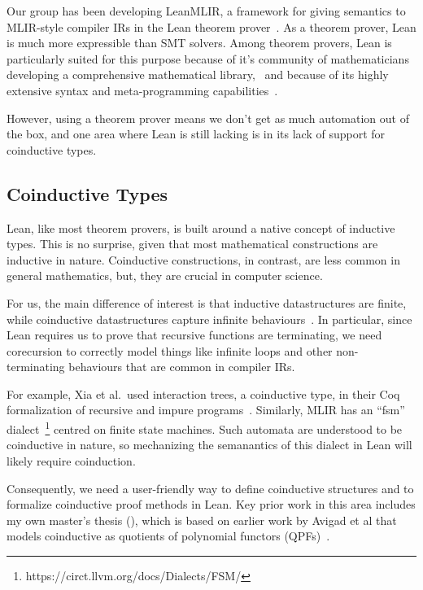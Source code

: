 \documentclass[a4paper]{scrartcl}
\begin{document}
Our group has been developing
LeanMLIR, a framework for giving
semantics to MLIR-style compiler IRs in the Lean theorem prover~\cite{demouraLeanTheoremProver2015}. 
As a theorem prover, Lean is
much more expressible than SMT solvers. Among theorem provers, Lean is
particularly suited for this purpose because of it's community of
mathematicians developing a comprehensive mathematical library,~\cite{themathlibcommunityLeanMathematicalLibrary2020} 
and because of its highly extensive syntax and meta-programming capabilities~\cite{ullrichNotationsHygienicMacro2022, paulinoMetaprogrammingLean}.

However, using a theorem prover means we don't get as much automation
out of the box, and one area where Lean is still lacking is in its lack
of support for coinductive types.


\subsection{Coinductive Types}\label{coinductive-types}

Lean, like most theorem provers, is built around a native concept
of inductive types. This is no surprise, given that most mathematical
constructions are inductive in nature. Coinductive constructions, in
contrast, are less common in general mathematics, but, they are crucial
in computer science.

For us, the main difference of interest is that inductive datastructures
are finite, while coinductive datastructures capture infinite
behaviours~\cite{sangiorgiIntroductionBisimulationCoinduction2011}.
In particular, since Lean requires us to prove that recursive functions are
terminating, we need corecursion to correctly model things like infinite
loops and other non-terminating behaviours that are common in compiler
IRs.

For example, Xia et al.~used interaction trees, a coinductive type, in
their Coq formalization of recursive and impure programs~\cite{xiaInteractionTreesRepresenting2020}.
Similarly, MLIR has an
``fsm'' dialect~\footnote{https://circt.llvm.org/docs/Dialects/FSM/}
centred on finite state machines. Such automata are understood to be
coinductive in nature, so mechanizing the semanantics of this dialect in
Lean will likely require coinduction.

Consequently, we need a user-friendly way to define coinductive
structures and to formalize coinductive proof methods in Lean. Key prior
work in this area includes my own master's thesis (\cite{keizerImplementingDefinitionalCo}), 
which is based on earlier
work by Avigad et al that models coinductive as quotients of polynomial
functors (QPFs)~\cite{avigadDataTypesQuotients2019}.
\end{document}
